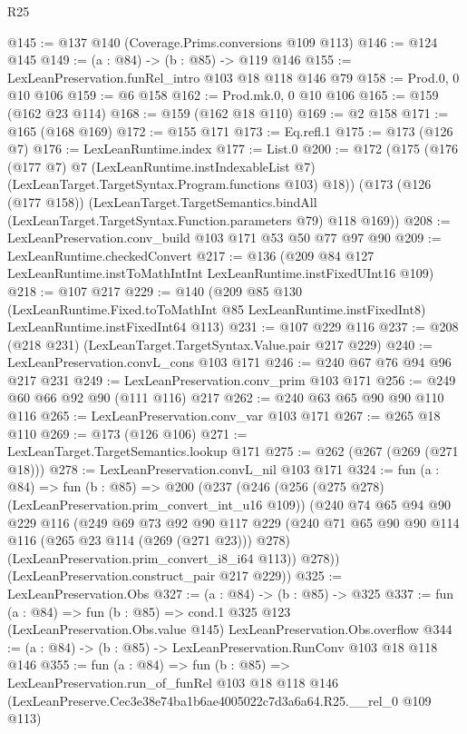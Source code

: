 \begin{lexlean}{R25}
\begin{coremodule}
@145 := @137 @140 (Coverage.Prims.conversions @109 @113)
@146 := @124 @145
@149 := (a : @84) -> (b : @85) -> @119 @146
@155 := LexLeanPreservation.funRel_intro @103 @18 @118 @146 @79
@158 := Prod.{0, 0} @10 @106
@159 := @6 @158
@162 := Prod.mk.{0, 0} @10 @106
@165 := @159 (@162 @23 @114)
@168 := @159 (@162 @18 @110)
@169 := @2 @158
@171 := @165 (@168 @169)
@172 := @155 @171
@173 := Eq.refl.{1}
@175 := @173 (@126 @7)
@176 := LexLeanRuntime.index
@177 := List.{0}
@200 := @172
    (@175
      (@176
        (@177 @7)
        @7
        (LexLeanRuntime.instIndexableList @7)
        (LexLeanTarget.TargetSyntax.Program.functions @103)
        @18))
    (@173
      (@126 (@177 @158))
      (LexLeanTarget.TargetSemantics.bindAll
        (LexLeanTarget.TargetSyntax.Function.parameters @79)
        @118
        @169))
@208 := LexLeanPreservation.conv_build @103 @171 @53 @50 @77 @97 @90
@209 := LexLeanRuntime.checkedConvert
@217 := @136 (@209 @84 @127 LexLeanRuntime.instToMathIntInt LexLeanRuntime.instFixedUInt16 @109)
@218 := @107 @217
@229 := @140
    (@209
      @85
      @130
      (LexLeanRuntime.Fixed.toToMathInt @85 LexLeanRuntime.instFixedInt8)
      LexLeanRuntime.instFixedInt64
      @113)
@231 := @107 @229 @116
@237 := @208 (@218 @231) (LexLeanTarget.TargetSyntax.Value.pair @217 @229)
@240 := LexLeanPreservation.convL_cons @103 @171
@246 := @240 @67 @76 @94 @96 @217 @231
@249 := LexLeanPreservation.conv_prim @103 @171
@256 := @249 @60 @66 @92 @90 (@111 @116) @217
@262 := @240 @63 @65 @90 @90 @110 @116
@265 := LexLeanPreservation.conv_var @103 @171
@267 := @265 @18 @110
@269 := @173 (@126 @106)
@271 := LexLeanTarget.TargetSemantics.lookup @171
@275 := @262 (@267 (@269 (@271 @18)))
@278 := LexLeanPreservation.convL_nil @103 @171
@324 := fun (a : @84) =>
  fun (b : @85) =>
  @200
    (@237
      (@246
        (@256 (@275 @278) (LexLeanPreservation.prim_convert_int_u16 @109))
        (@240
          @74
          @65
          @94
          @90
          @229
          @116
          (@249
            @69
            @73
            @92
            @90
            @117
            @229
            (@240 @71 @65 @90 @90 @114 @116 (@265 @23 @114 (@269 (@271 @23))) @278)
            (LexLeanPreservation.prim_convert_i8_i64 @113))
          @278))
      (LexLeanPreservation.construct_pair @217 @229))
@325 := LexLeanPreservation.Obs
@327 := (a : @84) -> (b : @85) -> @325
@337 := fun (a : @84) =>
  fun (b : @85) =>
  cond.{1} @325 @123 (LexLeanPreservation.Obs.value @145) LexLeanPreservation.Obs.overflow
@344 := (a : @84) -> (b : @85) -> LexLeanPreservation.RunConv @103 @18 @118 @146
@355 := fun (a : @84) =>
  fun (b : @85) =>
  LexLeanPreservation.run_of_funRel
    @103
    @18
    @118
    @146
    (LexLeanPreserve.Cec3e38e74ba1b6ae4005022c7d3a6a64.R25.__rel_0 @109 @113)
\end{coremodule}
\end{lexlean}
